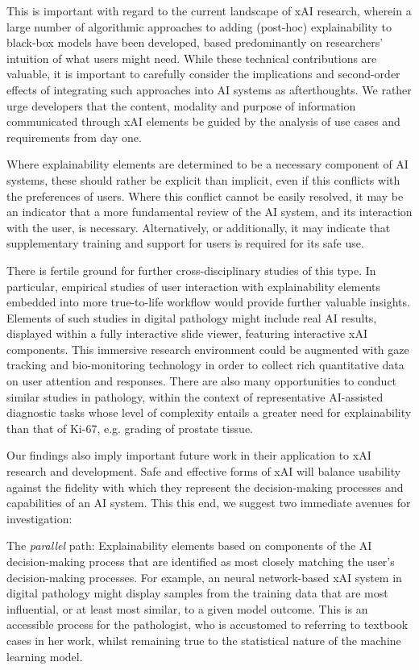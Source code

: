 \documentclass[final,5p,times,twocolumn,hyphens]{elsarticle}
\begin{document}
This is important with regard to the current landscape of xAI research, wherein a large number of algorithmic approaches to adding (post-hoc) explainability to black-box models have been developed, based predominantly on researchers' intuition of what users might need. While these technical contributions are valuable, it is important to carefully consider the implications and second-order effects of integrating such approaches into AI systems as afterthoughts. We rather urge developers that the content, modality and purpose of information communicated through xAI elements be guided by the analysis of use cases and requirements from day one.

Where explainability elements are determined to be a necessary component of AI systems, these should rather be explicit than implicit, even if this conflicts with the preferences of users. Where this conflict cannot be easily resolved, it may be an indicator that a more fundamental review of the AI system, and its interaction with the user, is necessary. Alternatively, or additionally, it may indicate that supplementary training and support for users is required for its safe use.

There is fertile ground for further cross-disciplinary studies of this type. In particular, empirical studies of user interaction with explainability elements embedded into more true-to-life workflow would provide further valuable insights. Elements of such studies in digital pathology might include real AI results, displayed within a fully interactive slide viewer, featuring interactive xAI components. This immersive research environment could be augmented with gaze tracking and bio-monitoring technology in order to collect rich quantitative data on user attention and responses. There are also many opportunities to conduct similar studies in pathology, within the context of representative AI-assisted diagnostic tasks whose level of complexity entails a greater need for explainability than that of Ki-67, e.g. grading of prostate tissue.

Our findings also imply important future work in their application to xAI research and development. Safe and effective forms of xAI will balance usability against the fidelity with which they represent the decision-making processes and capabilities of an AI system. This this end, we suggest two immediate avenues for investigation:

The \textit{parallel} path: Explainability elements based on components of the AI decision-making process that are identified as most closely matching the user's decision-making processes. For example, an neural network-based xAI system in digital pathology might display samples from the training data that are most influential, or at least most similar, to a given model outcome. This is an accessible process for the pathologist, who is accustomed to referring to textbook cases in her work, whilst remaining true to the statistical nature of the machine learning model.
\end{document}

